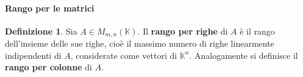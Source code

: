 \documentclass{article}
\theoremstyle{plain}
\theoremstyle{definition}
\newtheorem{defn}{Definizione}[section]
\theoremstyle{remark}
\begin{document}
\vspace{10pt}

\paragraph{Rango per le matrici}
\begin{bxthm}
\begin{defn}
    Sia $A\in M_{m,n}(\mathbb{K})$. Il \textbf{rango per righe} di $A$ è il rango dell'insieme delle sue righe, 
    cioè il massimo numero di righe linearmente indipendenti di $A$, considerate come vettori di $\mathbb{K}^{n}$. 
    Analogamente si definisce il \textbf{rango per colonne} di $A$.
\end{defn}
\end{bxthm}

\vspace{10pt}
\end{document}
